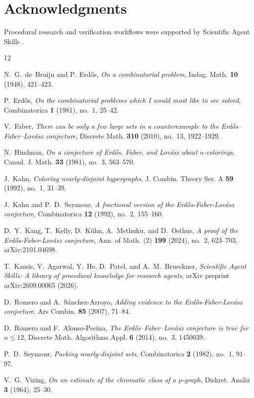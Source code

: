 \documentclass[11pt,reqno]{amsart}
\theoremstyle{definition}
\theoremstyle{remark}
\begin{document}
\section*{Acknowledgments}
Procedural research and verification workflows were supported by Scientific Agent Skills \cite{Kassis2026}.

\providecommand{\bysame}{\leavevmode\hbox to3em{\hrulefill}\thinspace}
\begin{thebibliography}{12}

N.~G.~de~Bruijn and P.~Erd{\H{o}}s, \emph{On a combinatorial problem}, Indag. Math. \textbf{10} (1948), 421--423.

P.~Erd{\H{o}}s, \emph{On the combinatorial problems which {I} would most like to see solved}, Combinatorica \textbf{1} (1981), no.~1, 25--42.

V.~Faber, \emph{There can be only a few large sets in a counterexample to the {E}rd{\H{o}}s--{F}aber--{L}ov{\'a}sz conjecture}, Discrete Math. \textbf{310} (2010), no.~13, 1922--1929.

N.~Hindman, \emph{On a conjecture of {E}rd{\H{o}}s, {F}aber, and {L}ov{\'a}sz about $n$-colorings}, Canad. J. Math. \textbf{33} (1981), no.~3, 563--570.

J.~Kahn, \emph{Coloring nearly-disjoint hypergraphs}, J. Combin. Theory Ser. A \textbf{59} (1992), no.~1, 31--39.

J.~Kahn and P.~D.~Seymour, \emph{A fractional version of the {E}rd{\H{o}}s-{F}aber-{L}ov{\'a}sz conjecture}, Combinatorica \textbf{12} (1992), no.~2, 155--160.

D.~Y.~Kang, T.~Kelly, D.~K{\"u}hn, A.~Methuku, and D.~Osthus, \emph{A proof of the {E}rd{\H{o}}s-{F}aber-{L}ov{\'a}sz conjecture}, Ann. of Math. (2) \textbf{199} (2024), no.~2, 623--703, arXiv:2101.04698.

T.~Kassis, V.~Agarwal, Y.~He, D.~Patel, and A.~M.~Brueckner, \emph{Scientific Agent Skills: {A} library of procedural knowledge for research agents}, arXiv preprint arXiv:2609.00065 (2026).

D.~Romero and A.~S{\'a}nchez-Arroyo, \emph{Adding evidence to the {E}rd{\H{o}}s-{F}aber-{L}ov{\'a}sz conjecture}, Ars Combin. \textbf{85} (2007), 71--84.

D.~Romero and F.~Alonso-Pecina, \emph{The {E}rd{\H{o}}s--{F}aber--{L}ov{\'a}sz conjecture is true for $n \le 12$}, Discrete Math. Algorithms Appl. \textbf{6} (2014), no.~3, 1450039.

P.~D.~Seymour, \emph{Packing nearly-disjoint sets}, Combinatorica \textbf{2} (1982), no.~1, 91--97.

V.~G.~Vizing, \emph{On an estimate of the chromatic class of a $p$-graph}, Diskret. Analiz \textbf{3} (1964), 25--30.

\end{thebibliography}
\end{document}
